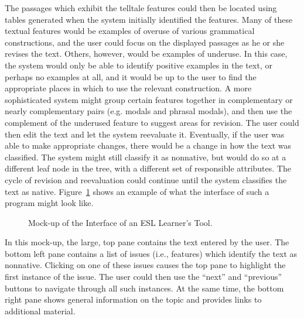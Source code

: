 \documentclass[main.tex]{subfiles}
\begin{document}
The passages which exhibit the telltale features could then be located using tables generated when the system initially identified the features. Many of these textual features would be examples of overuse of various grammatical constructions, and the user could focus on the displayed passages as he or she revises the text. Others, however, would be examples of underuse. In this case, the system would only be able to identify positive examples in the text, or perhaps no examples at all, and it would be up to the user to find the appropriate places in which to use the relevant construction. A more sophisticated system might group certain features together in complementary or nearly complementary pairs (e.g. modals and phrasal modals), and then use the complement of the underused feature to suggest areas for revision. The user could then edit the text and let the system reevaluate it. Eventually, if the user was able to make appropriate changes, there would be a change in how the text was classified. The system might still classify it as nonnative, but would do so at a different leaf node in the tree, with a different set of responsible attributes. The cycle of revision and reevaluation could continue until the system classifies the text as native. Figure~\ref{fig:mockup} shows an example of what the interface of such a program might look like.
\begin{figure}[htbp]
\centering
{}
\caption{Mock-up of the Interface of an ESL Learner's Tool.}
\label{fig:mockup}
\end{figure}
In this mock-up, the large, top pane contains the text entered by the user. The bottom left pane contains a list of issues (i.e., features) which identify the text as nonnative. Clicking on one of these issues causes the top pane to highlight the first instance of the issue. The user could then use the ``next'' and ``previous'' buttons to navigate through all such instances. At the same time, the bottom right pane shows general information on the topic and provides links to additional material.
\end{document}
